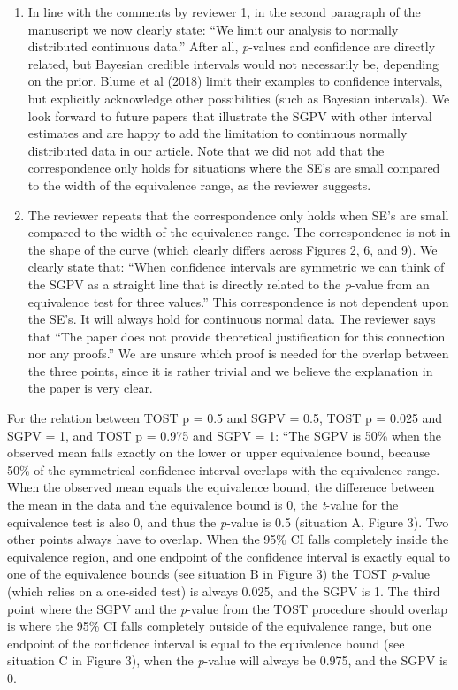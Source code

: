 \documentclass[man]{apa6}
\begin{document}
\begin{enumerate}
\def\labelenumi{\arabic{enumi}.}
\item
  In line with the comments by reviewer 1, in the second paragraph of
  the manuscript we now clearly state: \enquote{We limit our analysis to
  normally distributed continuous data.} After all, \emph{p}-values and
  confidence are directly related, but Bayesian credible intervals would
  not necessarily be, depending on the prior. Blume et al (2018) limit
  their examples to confidence intervals, but explicitly acknowledge
  other possibilities (such as Bayesian intervals). We look forward to
  future papers that illustrate the SGPV with other interval estimates
  and are happy to add the limitation to continuous normally distributed
  data in our article. Note that we did not add that the correspondence
  only holds for situations where the SE's are small compared to the
  width of the equivalence range, as the reviewer suggests.
\item
  The reviewer repeats that the correspondence only holds when SE's are
  small compared to the width of the equivalence range. The
  correspondence is not in the shape of the curve (which clearly differs
  across Figures 2, 6, and 9). We clearly state that: \enquote{When
  confidence intervals are symmetric we can think of the SGPV as a
  straight line that is directly related to the \emph{p}-value from an
  equivalence test for three values.} This correspondence is not
  dependent upon the SE's. It will always hold for continuous normal
  data. The reviewer says that \enquote{The paper does not provide
  theoretical justification for this connection nor any proofs.} We are
  unsure which proof is needed for the overlap between the three points,
  since it is rather trivial and we believe the explanation in the paper
  is very clear.
\end{enumerate}

For the relation between TOST p = 0.5 and SGPV = 0.5, TOST p = 0.025 and
SGPV = 1, and TOST p = 0.975 and SGPV = 1: ``The SGPV is 50\% when the
observed mean falls exactly on the lower or upper equivalence bound,
because 50\% of the symmetrical confidence interval overlaps with the
equivalence range. When the observed mean equals the equivalence bound,
the difference between the mean in the data and the equivalence bound is
0, the \emph{t}-value for the equivalence test is also 0, and thus the
\emph{p}-value is 0.5 (situation A, Figure 3). Two other points always
have to overlap. When the 95\% CI falls completely inside the
equivalence region, and one endpoint of the confidence interval is
exactly equal to one of the equivalence bounds (see situation B in
Figure 3) the TOST \emph{p}-value (which relies on a one-sided test) is
always 0.025, and the SGPV is 1. The third point where the SGPV and the
\emph{p}-value from the TOST procedure should overlap is where the 95\%
CI falls completely outside of the equivalence range, but one endpoint
of the confidence interval is equal to the equivalence bound (see
situation C in Figure 3), when the \emph{p}-value will always be 0.975,
and the SGPV is 0.
\end{document}
